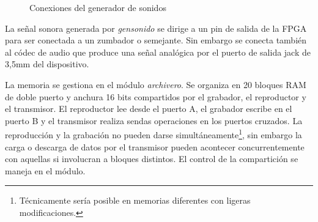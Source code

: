 \documentclass{article}
\begin{document}
\begin{figure}[ht]\centering

	\caption{Conexiones del generador de sonidos}
	\label{fig:gensonido}
\end{figure}

	\medskip La señal sonora generada por {\itshape gensonido} se dirige a un pin de salida de la FPGA para ser conectada a un zumbador o semejante. Sin embargo se conecta también al códec de audio que produce una señal analógica por el puerto de salida jack de 3,5mm del dispositivo.

	\medskip La memoria se gestiona en el módulo {\itshape archivero}. Se organiza en 20 bloques RAM de doble puerto y anchura 16 bits compartidos por el grabador, el reproductor y el transmisor. El reproductor lee desde el puerto A, el grabador escribe en el puerto B y el transmisor realiza sendas operaciones en los puertos cruzados. La reproducción y la grabación no pueden darse simultáneamente\footnote{Técnicamente sería posible en memorias diferentes con ligeras modificaciones.}, sin embargo la carga o descarga de datos por el transmisor pueden acontecer concurrentemente con aquellas si involucran a bloques distintos. El control de la compartición se maneja en el módulo.
\end{document}

